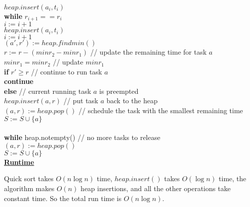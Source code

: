 \documentclass[11pt]{article}
\begin{document}
\begin{enumerate}
\begin{enumerate}
\-\hspace{6em} $heap.insert(a_i,t_i)$ \\
\-\hspace{6em} \textbf{while} $r_{i+1} == r_i$\\
\-\hspace{8em} $i := i + 1$ \\
\-\hspace{8em} $heap.insert(a_i,t_i)$ \\
\-\hspace{6em} $i := i + 1$ \\
\-\hspace{6em} $(a',r') := heap.findmin()$\\
\-\hspace{6em} $r := r - (minr_2 - minr_1)$ // update the remaining
time for task $a$\\
\-\hspace{6em} $minr_1 = minr_2$ // update $minr_1$\\
\-\hspace{6em} \textbf{if} $r' \geq r$ // continue to run task $a$\\
\-\hspace{8em} \textbf{continue}\\
\-\hspace{6em} \textbf{else} // current running task $a$ is preempted\\
\-\hspace{8em} $heap.insert(a,r)$ // put task $a$ back to the heap\\
\-\hspace{8em} $(a,r) := heap.pop()$ // schedule the task with the
smallest remaining time\\
\-\hspace{8em} $S := S \cup \{a\}$\\\\
\-\hspace{2em} \textbf{while} heap.notempty() // no more tasks to
release\\
\-\hspace{4em} $(a,r) := heap.pop()$\\
\-\hspace{4em} $S := S \cup \{a\}$\\

\underline{\textbf{Runtime}}

Quick sort takes $O(n\log n)$ time, $heap.insert()$ takes $O(\log n)$
time, the algorithm makes $O(n)$ heap insertions, and all the other
operations take constant time. So the total run time is $O(n\log n)$.


\end{enumerate}
\end{enumerate}
\end{document}
